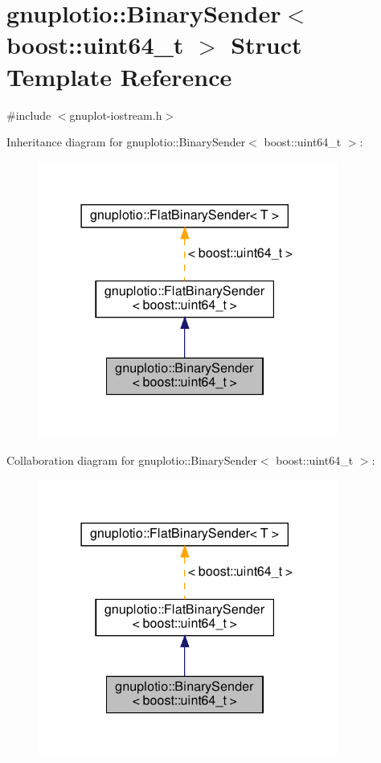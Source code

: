 \hypertarget{structgnuplotio_1_1_binary_sender_3_01boost_1_1uint64__t_01_4}{}\section{gnuplotio\+:\+:Binary\+Sender$<$ boost\+:\+:uint64\+\_\+t $>$ Struct Template Reference}
\label{structgnuplotio_1_1_binary_sender_3_01boost_1_1uint64__t_01_4}


{\ttfamily \#include $<$gnuplot-\/iostream.\+h$>$}



Inheritance diagram for gnuplotio\+:\+:Binary\+Sender$<$ boost\+:\+:uint64\+\_\+t $>$\+:
\nopagebreak
\begin{figure}[H]
\begin{center}
\leavevmode
\includegraphics[width=278pt]{structgnuplotio_1_1_binary_sender_3_01boost_1_1uint64__t_01_4__inherit__graph}
\end{center}
\end{figure}


Collaboration diagram for gnuplotio\+:\+:Binary\+Sender$<$ boost\+:\+:uint64\+\_\+t $>$\+:
\nopagebreak
\begin{figure}[H]
\begin{center}
\leavevmode
\includegraphics[width=278pt]{structgnuplotio_1_1_binary_sender_3_01boost_1_1uint64__t_01_4__coll__graph}
\end{center}
\end{figure}
